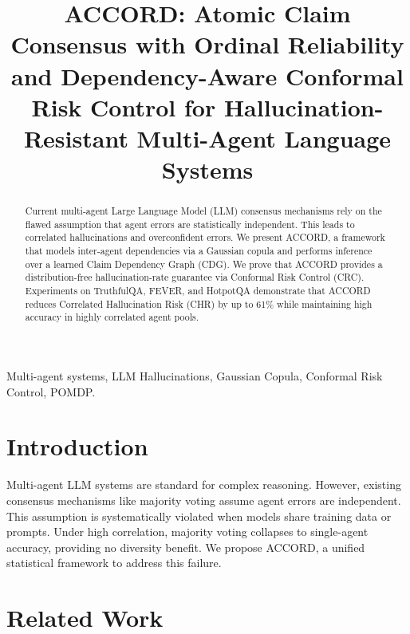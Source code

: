\documentclass[conference]{IEEEtran}
\begin{document}
\title{ACCORD: Atomic Claim Consensus with Ordinal Reliability and Dependency-Aware Conformal Risk Control for Hallucination-Resistant Multi-Agent Language Systems}

\author{
}

\maketitle

\begin{abstract}
Current multi-agent Large Language Model (LLM) consensus mechanisms rely on the flawed assumption that agent errors are statistically independent. This leads to correlated hallucinations and overconfident errors. We present ACCORD, a framework that models inter-agent dependencies via a Gaussian copula and performs inference over a learned Claim Dependency Graph (CDG). We prove that ACCORD provides a distribution-free hallucination-rate guarantee via Conformal Risk Control (CRC). Experiments on TruthfulQA, FEVER, and HotpotQA demonstrate that ACCORD reduces Correlated Hallucination Risk (CHR) by up to 61\% while maintaining high accuracy in highly correlated agent pools.
\end{abstract}

\begin{IEEEkeywords}
Multi-agent systems, LLM Hallucinations, Gaussian Copula, Conformal Risk Control, POMDP.
\end{IEEEkeywords}

\section{Introduction}
Multi-agent LLM systems are standard for complex reasoning. However, existing consensus mechanisms like majority voting assume agent errors are independent. This assumption is systematically violated when models share training data or prompts. Under high correlation, majority voting collapses to single-agent accuracy, providing no diversity benefit. We propose ACCORD, a unified statistical framework to address this failure.

\section{Related Work}
\end{document}
